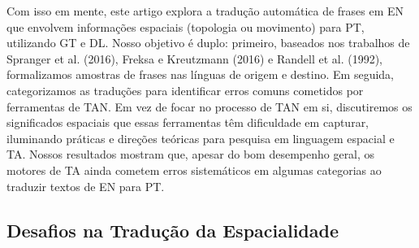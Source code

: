 \documentclass[a4paper, twocolumn, 11pt, twoside]{article}
\begin{document}
Com isso em mente, este artigo explora a tradução automática de frases em EN que envolvem informações espaciais (topologia ou movimento) para PT, utilizando GT e DL. Nosso objetivo é duplo: primeiro, baseados nos trabalhos de Spranger et al. (2016), Freksa e Kreutzmann (2016) e Randell et al. (1992), formalizamos amostras de frases nas línguas de origem e destino. Em seguida, categorizamos as traduções para identificar erros comuns cometidos por ferramentas de TAN. Em vez de focar no processo de TAN em si, discutiremos os significados espaciais que essas ferramentas têm dificuldade em capturar, iluminando práticas e direções teóricas para pesquisa em linguagem espacial e TA. Nossos resultados mostram que, apesar do bom desempenho geral, os motores de TA ainda cometem erros sistemáticos em algumas categorias ao traduzir textos de EN para PT.


\subsection{Desafios na Tradução da Espacialidade}
\end{document}
